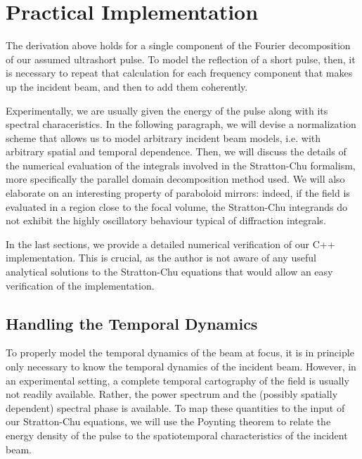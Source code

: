 \documentclass[11pt,SymmetricalJury]{inrsthesis/inrsthesis}
\begin{document}
\section{Practical Implementation}

The derivation above holds for a single component of the Fourier decomposition
of our assumed ultrashort pulse. To model the reflection of a short pulse, then,
it is necessary to repeat that calculation for each frequency component that
makes up the incident beam, and then to add them coherently.

Experimentally, we are usually given the energy of the pulse along
with its spectral characeristics. In the following paragraph, we will devise
a normalization scheme that allows us to model arbitrary incident beam models,
i.e. with arbitrary spatial and temporal dependence. Then, we will discuss
the details of the numerical evaluation of the integrals involved in the
Stratton-Chu formalism, more specifically the parallel domain decomposition
method used. We will also elaborate on an interesting property of paraboloid
mirrors: indeed, if the field is evaluated in a region close to the focal volume,
the Stratton-Chu integrands do not exhibit the highly oscillatory behaviour
typical of diffraction integrals.

In the last sections, we provide a detailed numerical verification of our
C++ implementation. This is crucial, as the author is not aware of any useful
analytical solutions to the Stratton-Chu equations that would allow an easy
verification of the implementation.


\subsection{Handling the Temporal Dynamics}

To properly model the temporal dynamics of the beam at focus, it is in principle
only necessary to know the temporal dynamics of the incident beam. However, in
an experimental setting, a complete temporal cartography of the field is usually
not readily available. Rather, the power spectrum and the (possibly spatially
dependent) spectral phase is available. To map these quantities to the input
of our Stratton-Chu equations, we will use the Poynting theorem to relate
the energy density of the pulse to the spatiotemporal characteristics of the
incident beam.
\end{document}
